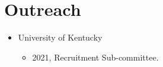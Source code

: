 \documentclass[11pt]{article}
\begin{document}
    \section*{Outreach}
        \begin{itemize}[leftmargin=.25in]
            \item University of Kentucky
                \begin{itemize}
                    \item 2021, Recruitment Sub-committee. 
                \end{itemize}
        
        \end{itemize} 
\end{document}
